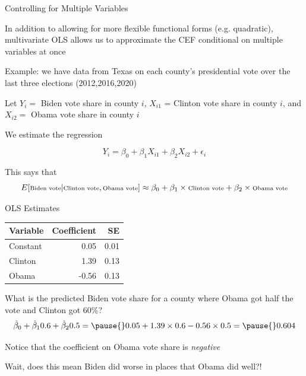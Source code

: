 \documentclass[11pt,english,handout]{beamer}
\newenvironment{wideitemize}{\itemize\addtolength{\itemsep}{10pt}}{\enditemize}
\begin{document}

	\begin{frame}{Controlling for Multiple Variables} 
		\begin{wideitemize}
			\item
			In addition to allowing for more flexible functional forms (e.g. quadratic), multivariate OLS allows us to approximate the CEF conditional on multiple variables at once
			
			\pause
			\item
			Example: we have data from Texas on each county's presidential vote over the last three elections (2012,2016,2020)
			
			\pause
			\item
			Let $Y_i = $ Biden vote share in county $i$, $X_{i1}$ = Clinton vote share in county $i$, and $X_{i2} = $ Obama vote share in county $i$
			
			\pause
			\item
			We estimate the regression 
			
			$$Y_i = \beta_0 + \beta_1 X_{i1} + \beta_2 X_{i2} + \epsilon_i$$
			
			\pause
			\item 
			This says that 
			$$\scriptsize  E[  \text{Biden vote} | \text{Clinton vote} , \text{Obama vote} ] \approx \beta_0 + \beta_1 \times \text{Clinton vote} + \beta_2 \times \text{Obama vote}  $$
		\end{wideitemize}	
	\end{frame}
	
	
	\begin{frame}{OLS Estimates}
		\begin{tabular}{lrr}
			Variable & Coefficient & SE \\ \hline
			Constant & 0.05 & 0.01 \\
			Clinton & 1.39 & 0.13 \\
			Obama & -0.56 & 0.13
		\end{tabular}
	\medskip 
	
	\pause
	\begin{wideitemize}
		\item
		What is the predicted Biden vote share for a county where Obama got half the vote and Clinton got 60\%?
		\pause
		$$\hat\beta_0 + \hat\beta_1 0.6 + \hat\beta_2 0.5 = \pause{} 0.05 + 1.39 \times 0.6 - 0.56 \times 0.5  = \pause{} 0.604$$
		\pause
\vspace{-0.5cm}
		\item
		Notice that the coefficient on Obama vote share is \textit{negative}
		\item
		Wait, does this mean Biden did worse in places that Obama did well?!
	\end{wideitemize}
	\end{frame}
\end{document}
